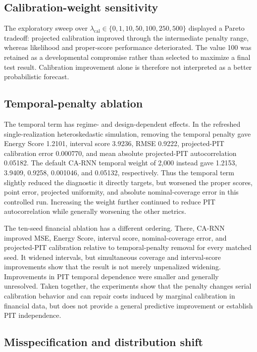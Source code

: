 \documentclass[11pt]{article}
\begin{document}
\subsection{Calibration-weight sensitivity}

The exploratory sweep over
$\lambda_{\mathrm{cal}}\in\{0,1,10,50,100,250,500\}$ displayed a Pareto
tradeoff: projected calibration improved through the intermediate penalty range,
whereas likelihood and proper-score performance deteriorated. The value 100 was
retained as a developmental compromise rather than selected to maximize a final
test result. Calibration improvement alone is therefore not interpreted as a
better probabilistic forecast.

\subsection{Temporal-penalty ablation}

The temporal term has regime- and design-dependent effects. In the refreshed
single-realization heteroskedastic simulation, removing the temporal penalty
gave Energy Score 1.2101, interval score 3.9236, RMSE 0.9222, projected-PIT
calibration error 0.000770, and mean absolute projected-PIT autocorrelation
0.05182. The default CA-RNN temporal weight of 2,000 instead gave 1.2153,
3.9409, 0.9258, 0.001046, and 0.05132, respectively. Thus the temporal term
slightly reduced the diagnostic it directly targets, but worsened the proper
scores, point error, projected uniformity, and absolute nominal-coverage error
in this controlled run. Increasing the weight further continued to reduce PIT
autocorrelation while generally worsening the other metrics.

The ten-seed financial ablation has a different ordering. There, CA-RNN improved
MSE, Energy Score, interval score, nominal-coverage error, and projected-PIT
calibration relative to temporal-penalty removal for every matched seed. It
widened intervals, but simultaneous coverage and interval-score improvements
show that the result is not merely unpenalized widening. Improvements in PIT
temporal dependence were smaller and generally unresolved. Taken together, the
experiments show that the penalty changes serial calibration behavior and can
repair costs induced by marginal calibration in financial data, but does not
provide a general predictive improvement or establish PIT independence.

\subsection{Misspecification and distribution shift}
\end{document}
